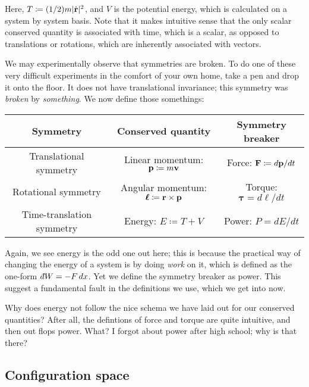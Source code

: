\documentclass[11pt]{article}
\begin{document}
Here, $T \coloneqq (1/2) m |\dot{\mathbf{r}}|^2$, and $V$ is the potential
energy, which is calculated on a system by system basis. Note that it makes intuitive sense that the only scalar
conserved quantity is associated with time, which is a scalar,
as opposed to translations or rotations, which are inherently
associated with vectors.

We may experimentally observe that symmetries are broken.
To do one of these very difficult experiments in the comfort of your
own home, take a pen and drop it onto the floor. It does not
have translational invariance; this symmetry was \emph{broken}
by \emph{something}. We now define those somethings:


\begin{table}[H]
    \centering
    \begin{tabular}{|c|c|c|}
        \hline
        Symmetry & Conserved quantity & Symmetry breaker\\
        \hline
        Translational symmetry & Linear momentum: $\mathbf{p} \coloneqq m \mathbf{v}$ & Force: $\mathbf{F} \coloneqq d\mathbf{p}/dt$\\
        Rotational symmetry & Angular momentum: $\boldsymbol{\ell} \coloneqq \mathbf{r} \times \mathbf{p}$ & Torque: $\boldsymbol{\tau} = d\boldsymbol{\ell}/dt$\\
        Time-translation symmetry & Energy: $E \coloneqq T + V$ & Power: $P = dE/dt$\\
        \hline
    \end{tabular}
\end{table}

Again, we see energy is the odd one out here; this is because
the practical way of changing the energy of a system is by
doing \emph{work} on it, which is defined as the one-form $\dbar W = - F \, dx$.
Yet we define the symmetry breaker as power. This suggest a fundamental
fault in the definitions we use, which we get into now.

\begin{reemark}
    Why does energy not follow the nice schema we have laid
    out for our conserved quantities? After all, the defintions
    of force and torque are quite intuitive, and then out flops
    power. What? I forgot about power after high school; why is that
    there? 
\end{reemark}

\subsection{Configuration space}
\end{document}
